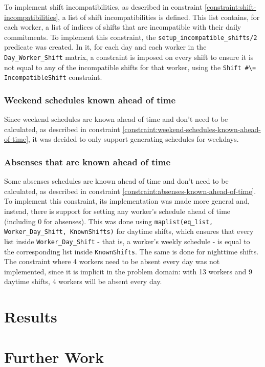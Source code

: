 \documentclass[conference]{IEEEtran}
\begin{document}
To implement shift incompatibilities, as described in constraint \ref{constraint:shift-incompatibilities}, a list of shift incompatibilities is defined. This list contains, for each worker, a list of indices of shifts that are incompatible with their daily commitments.
To implement this constraint, the \texttt{setup\_incompatible\_shifts/2} predicate was created. In it, for each day and each worker in the \texttt{Day\_Worker\_Shift} matrix, a constraint is imposed on every shift to ensure it is not equal to any of the incompatible shifts for that worker, using the \texttt{Shift \#\textbackslash= IncompatibleShift} constraint.

\subsubsection*{Weekend schedules known ahead of time}

Since weekend schedules are known ahead of time and don't need to be calculated, as described in constraint \ref{constraint:weekend-schedules-known-ahead-of-time}, it was decided to only support generating schedules for weekdays.

\subsubsection*{Absenses that are known ahead of time}

Some absenses schedules are known ahead of time and don't need to be calculated, as described in constraint \ref{constraint:absenses-known-ahead-of-time}. To implement this constraint, its implementation was made more general and, instead, there is support for setting any worker's schedule ahead of time (including 0 for absenses).
This was done using \texttt{maplist(eq\_list, Worker\_Day\_Shift, KnownShifts)} for daytime shifts, which ensures that every list inside \texttt{Worker\_Day\_Shift} - that is, a worker's weekly schedule - is equal to the corresponding list inside \texttt{KnownShifts}. The same is done for nighttime shifts.
The constraint where 4 workers need to be absent every day was not implemented, since it is implicit in the problem domain: with 13 workers and 9 daytime shifts, 4 workers will be absent every day.

\section{Results}
\label{section:results}

\section{Further Work}
\label{section:further-work}
\end{document}
